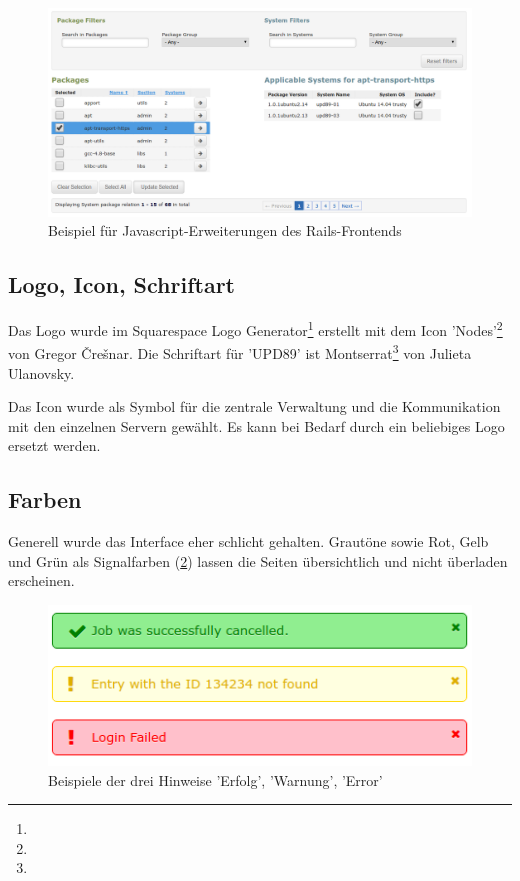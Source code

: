 \begin{figure}[H]
	\centering
	\includegraphics[width=\linewidth]{files/combo_view}
	\caption{Beispiel für Javascript-Erweiterungen des Rails-Frontends}
	\label{fig:design:js_example}
\end{figure}

\subsection*{Logo, Icon, Schriftart}

Das Logo wurde im Squarespace Logo Generator\footnote{} erstellt mit dem Icon 'Nodes'\footnote{} von Gregor Črešnar. Die Schriftart für 'UPD89' ist Montserrat\footnote{} von Julieta Ulanovsky.

Das Icon wurde als Symbol für die zentrale Verwaltung und die Kommunikation mit den einzelnen Servern gewählt. Es kann bei Bedarf durch ein beliebiges Logo ersetzt werden.

\subsection*{Farben}

Generell wurde das Interface eher schlicht gehalten. Grautöne sowie Rot, Gelb und Grün als Signalfarben (\ref{fig:design:messages}) lassen die Seiten übersichtlich und nicht überladen erscheinen.

\begin{figure}[H]
	\centering
	\includegraphics[width=0.5\linewidth]{files/messages}
	\caption{Beispiele der drei Hinweise 'Erfolg', 'Warnung', 'Error'}
	\label{fig:design:messages}
\end{figure}

